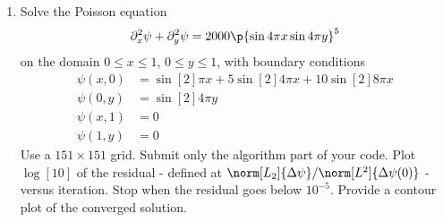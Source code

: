 \documentclass[11pt, oneside]{article}
\begin{document}
\begin{enumerate}
  \item %
    Solve the Poisson equation
    \[
      \partial^2_x \psi + \partial^2_y \psi = 2000\p{\sin{4 \pi x} \sin{4 \pi y}}^5
    \]
    on the domain $0 \le x \le 1$, $0 \le y \le 1$, with boundary conditions
    \begin{align*}
      \psi(x, 0) &= \sin[2]{\pi x} + 5\sin[2]{4\pi x} + 10 \sin[2]{8 \pi x} \\
      \psi(0, y) &= \sin[2]{4\pi y} \\
      \psi(x, 1) &= 0 \\
      \psi(1, y) &= 0
    \end{align*}
    Use a $151 \times 151$ grid.
    Submit only the algorithm part of your code.
    Plot $\log[10]{}$ of the residual - defined at
    $\norm[L_2]{\Delta \psi}/\norm[L^2]{\Delta \psi(0)}$ - versus iteration.
    Stop when the residual goes below $10^{-5}$.
    Provide a contour plot of the converged solution.


\end{enumerate}
\end{document}
